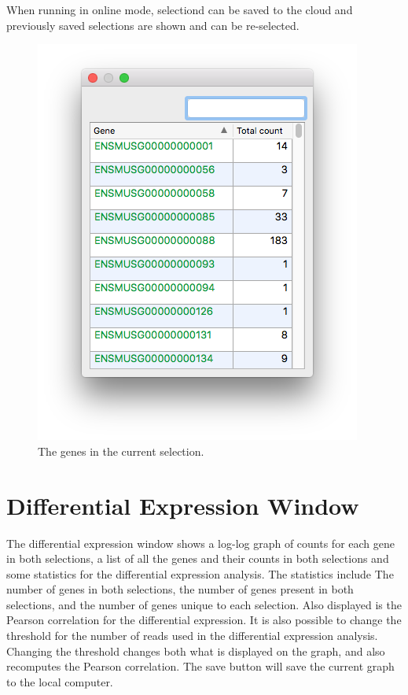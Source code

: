 \documentclass[10pt,a4paper,titlepage]{book}
\begin{document}
When running in online mode, selectiond can be saved to the cloud and previously saved selections are shown and can be re-selected.

\begin{figure}[h]
	\centering
	\includegraphics[scale=0.5]{./Pictures/selection_gene_list}
	\caption{The genes in the current selection.}
	\label{fig:selection_gene_list}
\end{figure}

\clearpage

\section{Differential Expression Window}

The differential expression window shows a log-log graph of counts for each gene in both selections, a list of all the genes and their counts in both selections and some statistics for the differential expression analysis. The statistics include The number of genes in both selections, the number of genes present in both selections, and the number of genes unique to each selection. Also displayed is the Pearson correlation for the differential expression. It is also possible to change the threshold for the number of reads used in the differential expression analysis. Changing the threshold changes both what is displayed on the graph, and also recomputes the Pearson correlation. The save button will save the current graph to the local computer.
\end{document}
